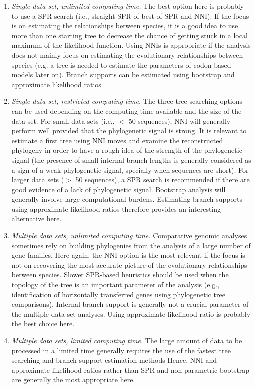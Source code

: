 \documentclass[a4paper,12pt]{article}
\begin{document}
\begin{enumerate}
\item {\em Single data set, unlimited computing time.} The best option here is probably to use a SPR
search (i.e., straight SPR of best of SPR and NNI).  If the focus is on estimating the relationships
between species,  it is a good  idea to use  more than one starting  tree to decrease the  chance of
getting stuck  in a  local maximum of  the likelihood  function.  Using NNIs  is appropriate  if the
analysis does not mainly focus on  estimating the evolutionary relationships between species (e.g. a
tree is needed to  estimate the parameters of codon-based models later  on).  Branch supports can be
estimated using bootstrap and approximate likelihood ratios.

\item {\em  Single data set, restricted  computing time.}  The  three tree searching options  can be
used depending on  the computing time available and the  size of the data set.   For small data sets
(i.e., $<$ 50 sequences),  NNI will generally perform well provided that  the phylogenetic signal is
strong.  It  is relevant  to estimate a  first tree  using NNI moves  and examine  the reconstructed
phylogeny in order to have a rough idea  of the strength of the phylogenetic signal (the presence of
small internal  branch lengths  is generally  considered as a  sign of  a weak  phylogenetic signal,
specially when  sequences are  short).  For larger  data sets  ($>$ 50 sequences),  a SPR  search is
recommended if there  are good evidence of  a lack of phylogenetic signal.   Bootstrap analysis will
generally  involve  large  computational  burdens.   Estimating branch  supports  using  approximate
likelihood ratios therefore provides an interesting alternative here.

\item {\em  Multiple data  sets, unlimited computing  time.} Comparative genomic  analyses sometimes
rely on building phylogenies from the analysis of  a large number of gene families.  Here again, the
NNI option is the most  relevant if the focus is not on recovering the  most accurate picture of the
evolutionary relationships  between species.   Slower SPR-based heuristics  should be used  when the
topology of the tree is an important parameter of the analysis (e.g., identification of horizontally
transferred genes using phylogenetic tree comparisons).   Internal branch support is generally not a
crucial parameter of the multiple data  set analyses. Using approximate likelihood ratio is probably
the best choice here.

\item {\em Multiple data sets, limited computing time.}  The large amount of data to be processed in
a  limited time  generally  requires  the use  of  the fastest  tree  searching  and branch  support
estimation methods Hence,  NNI and approximate likelihood ratios rather  than SPR and non-parametric
bootstrap are generally the most appropriate here.
\end{enumerate}
 
\end{document}
